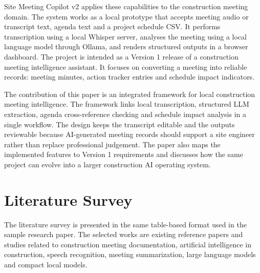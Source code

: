 \documentclass[11pt,a4paper]{article}
\begin{document}
Site Meeting Copilot v2 applies these capabilities to the construction meeting domain. The system works as a local prototype that accepts meeting audio or transcript text, agenda text and a project schedule CSV. It performs transcription using a local Whisper server, analyses the meeting using a local language model through Ollama, and renders structured outputs in a browser dashboard. The project is intended as a Version 1 release of a construction meeting intelligence assistant. It focuses on converting a meeting into reliable records: meeting minutes, action tracker entries and schedule impact indicators.

The contribution of this paper is an integrated framework for local construction meeting intelligence. The framework links local transcription, structured LLM extraction, agenda cross-reference checking and schedule impact analysis in a single workflow. The design keeps the transcript editable and the outputs reviewable because AI-generated meeting records should support a site engineer rather than replace professional judgement. The paper also maps the implemented features to Version 1 requirements and discusses how the same project can evolve into a larger construction AI operating system.

\section{Literature Survey}

The literature survey is presented in the same table-based format used in the sample research paper. The selected works are existing reference papers and studies related to construction meeting documentation, artificial intelligence in construction, speech recognition, meeting summarization, large language models and compact local models.
\end{document}
